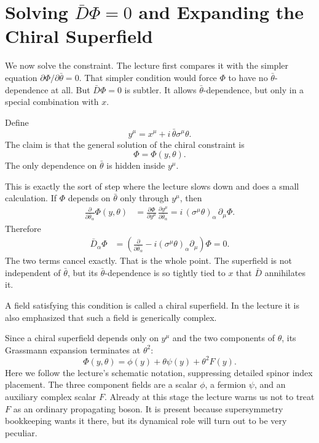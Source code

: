 \section{Solving \(\bar D\Phi=0\) and Expanding the Chiral Superfield}

We now solve the constraint. The lecture first compares it with the simpler equation \(\partial\Phi/\partial\bar\theta=0\). That simpler condition would force \(\Phi\) to have no \(\bar\theta\)-dependence at all. But \(\bar D\Phi=0\) is subtler. It allows \(\bar\theta\)-dependence, but only in a special combination with \(x\).

Define
\begin{equation}
y^\mu=x^\mu+i\,\bar\theta \sigma^\mu \theta.
\end{equation}
The claim is that the general solution of the chiral constraint is
\begin{equation}
\Phi=\Phi(y,\theta).
\end{equation}
The only dependence on \(\bar\theta\) is hidden inside \(y^\mu\).

This is exactly the sort of step where the lecture slows down and does a small calculation. If \(\Phi\) depends on \(\bar\theta\) only through \(y^\mu\), then
\begin{align}
\frac{\partial}{\partial \bar\theta_\alpha}\Phi(y,\theta)
&=
\frac{\partial \Phi}{\partial y^\mu}\,
\frac{\partial y^\mu}{\partial \bar\theta_\alpha}
=
i\,(\sigma^\mu\theta)_\alpha\,\partial_\mu \Phi .
\end{align}
Therefore
\begin{align}
\bar D_\alpha \Phi
&=
\left(
\frac{\partial}{\partial \bar\theta_\alpha}
-
i(\sigma^\mu\theta)_\alpha\partial_\mu
\right)\Phi
=
0.
\end{align}
The two terms cancel exactly. That is the whole point. The superfield is not independent of \(\bar\theta\), but its \(\bar\theta\)-dependence is so tightly tied to \(x\) that \(\bar D\) annihilates it.

A field satisfying this condition is called a chiral superfield. In the lecture it is also emphasized that such a field is generically complex.

Since a chiral superfield depends only on \(y^\mu\) and the two components of \(\theta\), its Grassmann expansion terminates at \(\theta^2\):
\begin{equation}
\Phi(y,\theta)=\phi(y)+\theta\psi(y)+\theta^2 F(y).
\end{equation}
Here we follow the lecture's schematic notation, suppressing detailed spinor index placement. The three component fields are a scalar \(\phi\), a fermion \(\psi\), and an auxiliary complex scalar \(F\). Already at this stage the lecture warns us not to treat \(F\) as an ordinary propagating boson. It is present because supersymmetry bookkeeping wants it there, but its dynamical role will turn out to be very peculiar.


